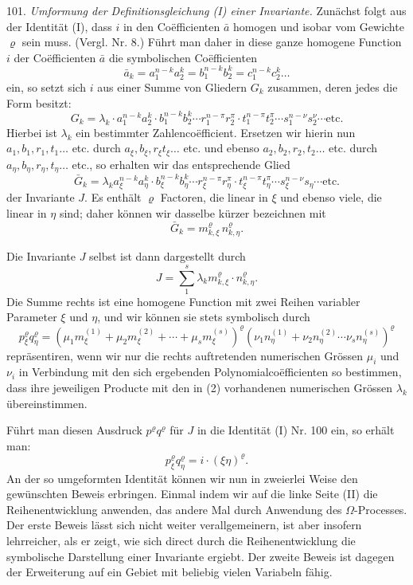 \documentclass[11pt]{article}
\providecommand{\weberpage}[1]{}
\providecommand{\weq}[2]{\begin{equation}\tag{#1}#2\end{equation}}
\let\Omega\varOmega
\begin{document}
101. \textit{Umformung der Definitionsgleichung (I) einer Invariante.} Zunächst
 folgt aus der Identität (I), dass $i$ in den Co\"efficienten $\bar{a}$ homogen
und isobar vom Gewichte $\varrho$ sein muss. (Vergl. Nr. 8.) Führt man
daher in diese ganze homogene Function $i$ der Co\"efficienten $\bar{a}$ die
symbolischen Co\"efficienten
\[
\bar{a}_k = a_1^{n-k}a_2^k = b_1^{n-k}b_2^k = c_1^{n-k}c_2^k \ldots
\]
ein, so setzt sich $i$ aus einer Summe von Gliedern $G_k$ zusammen,
deren jedes die Form besitzt:
\[
G_k = \lambda_k \cdot a_1^{n-k}a_2^k \cdot b_1^{n-k}b_2^k \cdots r_1^{n-\pi}r_2^\pi \cdot t_1^{n-\pi}t_2^\pi \cdots s_1^{n-\nu}s_2^\nu \cdots \text{etc.}
\]
Hierbei ist $\lambda_k$ ein bestimmter Zahlenco\"efficient. Ersetzen wir hierin
nun $a_1, b_1, r_1, t_1 \ldots$ etc. durch $a_\xi, b_\xi, r_\xi t_\xi \ldots$ etc. und ebenso $a_2,
b_2, r_2, t_2 \ldots$ etc. durch $a_\eta, b_\eta, r_\eta, t_\eta \ldots$ etc., so erhalten wir das entsprechende
 Glied
\weq{1}{\bar{G}_k = \lambda_k a_\xi^{n-k}a_\eta^k \cdot b_\xi^{n-k}b_\eta^k \cdots r_\xi^{n-\pi}r_\eta^\pi \cdot t_\xi^{n-\pi}t_\eta^\pi \cdots s_\xi^{n-\nu}s_\eta \cdots \text{etc.}}
der Invariante $J$. Es enthält $\varrho$ Factoren, die linear in $\xi$ und ebenso
viele, die linear in $\eta$ sind; daher können wir dasselbe kürzer bezeichnen
 mit
\[
\bar{G}_k = m^\varrho_{k,\xi}\,n^\varrho_{k,\eta}.
\]


\weberpage{112}
Die Invariante $J$ selbst ist dann dargestellt durch
\weq{2}{J = \sum_1^s \lambda_k m^\varrho_{k,\xi}\cdot n^\varrho_{k,\eta}.}
Die Summe rechts ist eine homogene Function mit zwei Reihen
variabler Parameter $\xi$ und $\eta$, und wir können sie stets symbolisch
durch
\weq{2a}{p^\varrho_\xi q^\varrho_\eta = (\mu_1m_\xi^{(1)} + \mu_2m_\xi^{(2)} + \cdots + \mu_sm_\xi^{(s)})^\varrho(\nu_1n_\eta^{(1)} + \nu_2n_\eta^{(2)} \cdots \nu_sn_\eta^{(s)})^\varrho}
repräsentiren, wenn wir nur die rechts auftretenden numerischen Grössen
$\mu_i$ und $\nu_i$ in Verbindung mit den sich ergebenden Polynomialco\"efficienten
 so bestimmen, dass ihre jeweiligen Producte mit den in (2) vorhandenen
 numerischen Grössen $\lambda_k$ übereinstimmen.

Führt man diesen Ausdruck $p^\varrho q^\varrho$ für $J$ in die Identität (I) Nr. 100
ein, so erhält man:
\weq{II}{p^\varrho_\xi q^\varrho_\eta = i\cdot(\xi\eta)^\varrho.}
An der so umgeformten Identität können wir nun in zweierlei
Weise den gewünschten Beweis erbringen. Einmal indem wir auf die
linke Seite (II) die Reihenentwicklung anwenden, das andere Mal
durch Anwendung des $\Omega$-Processes. Der erste Beweis lässt sich nicht
weiter verallgemeinern, ist aber insofern lehrreicher, als er zeigt, wie
sich direct durch die Reihenentwicklung die symbolische Darstellung
einer Invariante ergiebt. Der zweite Beweis ist dagegen der Erweiterung
 auf ein Gebiet mit beliebig vielen Variabeln fähig.
\end{document}
